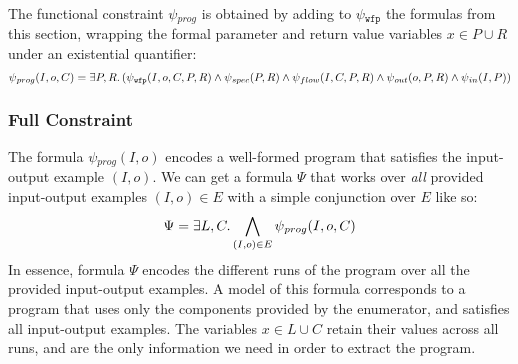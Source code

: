 The functional constraint $\psi{}_{prog}$ is obtained by adding to
$\psi{}_{\mathtt{wfp}}$ the formulas from this section, wrapping the formal
parameter and return value variables $x \in P \cup R$ under an existential
quantifier:
%
\[
  \psi{}_{prog}(I, o, C) = \exists P,R\ldotp
  (\psi{}_{\mathtt{wfp}}(I, o, C, P, R) \wedge
  \psi{}_{spec}(P, R) \wedge
  \psi{}_{flow}(I, C, P, R) \wedge 
  \psi{}_{out}(o, P, R) \wedge
  \psi{}_{in}(I, P))
\]

\subsubsection{Full Constraint}
\label{sec:full-constraint}

The formula $\psi{}_{prog}(I, o)$ encodes a well-formed program that satisfies
the input-output example $(I, o)$.
We can get a formula $\Psi{}$ that works over \textit{all} provided input-output
examples $(I, o) \in E$ with a simple conjunction over $E$ like so:
%
\[
  \Psi{} = \exists L,C\ldotp \bigwedge_{(I, o) \in E}\psi{}_{prog}(I, o, C)
\]
%
\noindent
In essence, formula $\Psi{}$ encodes the different runs of the program over all
the provided input-output examples. A model of this formula corresponds to a
program that uses only the components provided by the enumerator, and satisfies
all input-output examples. The variables $x \in L \cup C$ retain their values
across all runs, and are the only information we need in order to extract the
program.